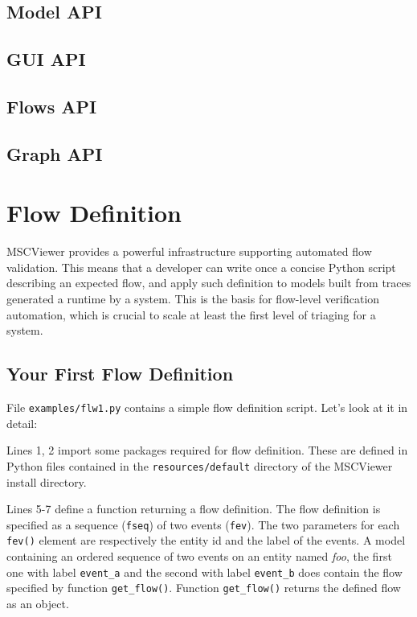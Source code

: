 \documentclass[11pt, twoside, titlepage]{book}
\newcommand{\prog}{MSCViewer}
\begin{document}
\subsection{Model API}



\subsection{GUI API}


\subsection{Flows API}
\label{sec:flow-api}


\subsection{Graph API}



\section{Flow Definition}
\label{chp:flowdef}

\prog{} provides a powerful infrastructure supporting automated flow validation.
This means that a developer can write once a concise Python script describing an expected flow,
and apply such definition to models built from traces generated a runtime by a system. This
is the basis for flow-level verification automation, which is crucial to scale at least the first
level of triaging for a system.

\subsection{Your First Flow Definition}
File \texttt{examples/flw1.py} contains a simple flow definition script. Let's look at it in detail:


\noindent Lines 1, 2 import some packages required for flow definition. These are defined in Python files
contained in the \texttt{resources/default} directory of the \prog{} install directory.

Lines 5-7 define a function returning a flow definition. The flow definition is specified as a sequence (\texttt{fseq})
of two events (\texttt{fev}). The two parameters for each \texttt{fev()} element are respectively the entity id and
the label of the events. A model containing an ordered sequence of two events on an entity named \textit{foo}, the 
first one with label \texttt{event\_a} and the second with label \texttt{event\_b} does contain the flow specified
by function \texttt{get\_flow()}. Function \texttt{get\_flow()} returns the defined flow as an object. 
\end{document}
